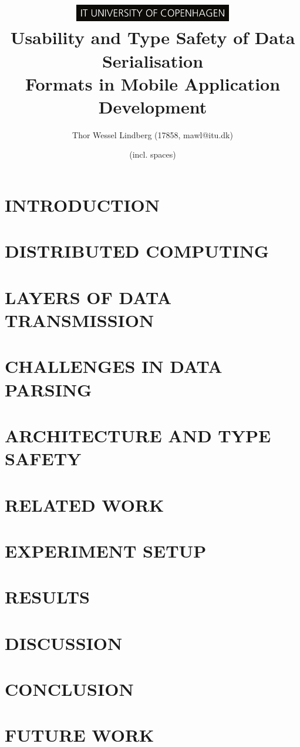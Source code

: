 \documentclass[10pt, twocolumn, letterpaper]{article}
\title{
    \includegraphics[height=0.75cm]{logo.jpg} \\
    \vspace{1.25cm}
    \LARGE \textbf{Usability and Type Safety of Data Serialisation} \\
    \LARGE \textbf{Formats in Mobile Application Development} \\
}
\author{Thor Wessel Lindberg (17858, mawl@itu.dk)}
\date{\charactercount{report} (incl. spaces)}
\begin{document}
\maketitle



\section{INTRODUCTION}


\section{DISTRIBUTED COMPUTING}


\section{LAYERS OF DATA TRANSMISSION}


\section{CHALLENGES IN DATA PARSING}


\section{ARCHITECTURE AND TYPE SAFETY}


\section{RELATED WORK}


\section{EXPERIMENT SETUP}


\section{RESULTS}


\section{DISCUSSION}


\section{CONCLUSION}


\section{FUTURE WORK}



\end{document}
